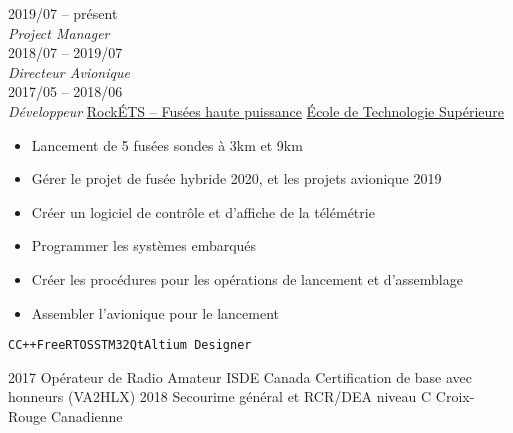 \documentclass[9pt]{developercv} %
\begin{document}
\begin{minipage}[t]{0.8\textwidth}
\begin{entrylist}
	\entry
		{2019/07 -- présent\\{\small\emph{Project Manager}}\\2018/07 -- 2019/07\\{\small\emph{Directeur Avionique}}\\2017/05 -- 2018/06\\{\small\emph{Développeur}}}
		{\href{https://clubrockets.ca/}{RockÉTS -- Fusées haute puissance}}
		{\href{https://clubrockets.ca/}{École de Technologie Supérieure}}
		{
			\vspace{-14pt}
			\begin{itemize}
				\renewcommand{\labelitemi}{\raisebox{.45ex}{\rule{.6ex}{.6ex}}}
				\setlength\itemsep{-1pt}
				\item Lancement de 5 fusées sondes à 3km et 9km
				\item Gérer le projet de fusée hybride 2020, et les projets avionique 2019
				\item Créer un logiciel de contrôle et d'affiche de la télémétrie
				\item Programmer les systèmes embarqués
				\item Créer les procédures pour les opérations de lancement et d'assemblage
				\item Assembler l'avionique pour le lancement
			\end{itemize}
			\vspace{-4pt}
			\texttt{C}\slashsep\texttt{C++}\slashsep\texttt{FreeRTOS}\slashsep\texttt{STM32}\slashsep\texttt{Qt}\slashsep\texttt{Altium Designer}
		}
\end{entrylist}



\begin{entrylist}
	\entry
		{2017}
		{Opérateur de Radio Amateur}
		{ISDE Canada}
		{
			Certification de base avec honneurs (VA2HLX)
		}
	\entry
		{2018}
		{Secourime général et RCR/DEA niveau C}
		{Croix-Rouge Canadienne}
		{\vspace{-14pt}}
\end{entrylist}
\end{minipage}
\begin{minipage}[t]{0.02\textwidth}
	\hfill
\end{minipage}
\end{document}
